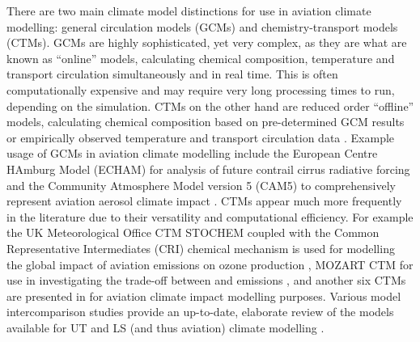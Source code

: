 There are two main climate model distinctions for use in aviation climate modelling: general circulation models (GCMs) and chemistry-transport models (CTMs). GCMs are highly sophisticated, yet very complex, as they are what are known as ``online'' models, calculating chemical composition, temperature and transport circulation simultaneously and in real time. This is often computationally expensive and may require very long processing times to run, depending on the simulation. CTMs on the other hand are reduced order ``offline'' models, calculating chemical composition based on pre-determined GCM results or empirically observed temperature and transport circulation data \cite{IPCC1999}. Example usage of GCMs in aviation climate modelling include the European Centre HAmburg Model (ECHAM) \cite{Stevens2013} for analysis of future contrail cirrus radiative forcing \cite{Bock2019} and the Community Atmosphere Model version 5 (CAM5) \cite{Neale2004} to comprehensively represent aviation aerosol climate impact \cite{Gettelman2013}. CTMs appear much more frequently in the literature due to their versatility and computational efficiency. For example the UK Meteorological Office CTM STOCHEM \cite{Cooke2010} coupled with the Common Representative Intermediates (CRI) chemical mechanism \cite{Jenkin2008} is used for modelling the global impact of aviation  emissions on ozone production \cite{Wasiuk2014}, MOZART CTM \cite{Emmons2010} for use in investigating the trade-off between  and  emissions \cite{Freeman2017}, and another six CTMs are presented in \cite{IPCC1999} for aviation climate impact modelling purposes. Various model intercomparison studies provide an up-to-date, elaborate review of the models available for UT and LS (and thus aviation) climate modelling \cite{Roelofs2003}. 



